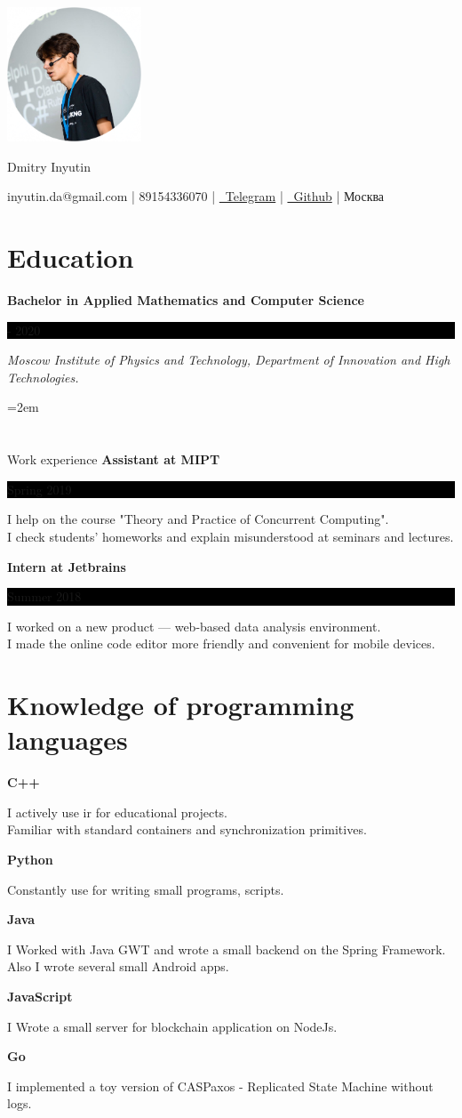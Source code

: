 \documentclass[fontsize=11pt]{article}
\newcommand{\MyName}[1]{ %
    \Huge \centering #1
    \par \normalsize \normalfont}
\newcommand{\NewPart}[1]{\section*{#1}}
\newcommand{\ProgrammingEntry}[2]{
    \noindent \textbf{#1} \hfill      %

    \noindent \small #2 %
    \normalsize \par}
\newcommand{\EducationEntry}[4]{
    \noindent \textbf{#1} \hfill      %
    \colorbox{Black}{
      \parbox{10em}{
      \color{White} \centering #2}} \par   %
    \noindent \textit{#3} \par        %
    \noindent\hangindent=2em\hangafter=0 \small #4 %
    \normalsize \par}
\newcommand{\WorkEntry}[3]{       %
    \noindent \large \textbf{#1} \hfill      %
    \colorbox{Black}{%
      \parbox{10em}{%
      \color{White} \centering #2}} \par  %
    \noindent \small #3 %
    \normalsize \par}
\begin{document}
\begin{minipage}{0.2\textwidth}%
\includegraphics[width=4cm]{me.png}
\end{minipage}%
\hfill%
\begin{minipage}{14cm}\raggedright
\bigskip
\bigskip
\bigskip
\bigskip
\bigskip
\bigskip
\MyName{Dmitry Inyutin}
\bigskip
{inyutin.da@gmail.com | 89154336070 | \href{https://t.me/inyutin}{\faTelegram \, Telegram} | \href{https://github.com/inyutin}{\faGithub \, Github} | Москва}
\end{minipage}



\NewPart{Education}{}
\EducationEntry
{Bachelor in Applied Mathematics and Computer Science}
{2016 - 2020}
{Moscow Institute of Physics and Technology, Department of Innovation and High Technologies.}

\NewPart{Work experience}{}
\WorkEntry
{Assistant at MIPT}
{Spring 2019}
{I help on the course "Theory and Practice of Concurrent Computing". \\ I check students' homeworks and explain misunderstood at seminars and lectures.}

\bigskip

\WorkEntry
{Intern at Jetbrains}
{Summer 2018}
{I worked on a new product — web-based data analysis environment. \\ I made the online code editor more friendly and convenient for mobile devices.}

\NewPart{Knowledge of programming languages}{}
\ProgrammingEntry
{C++ \bigstar \bigstar \bigstar}
{I actively use ir for educational projects. \\ Familiar with standard containers and synchronization primitives.}
\bigskip
\ProgrammingEntry
{Python \bigstar \bigstar \bigstar}
{Constantly use for writing small programs, scripts.}
\bigskip
\ProgrammingEntry
{Java \bigstar \bigstar}
{I Worked with Java GWT and wrote a small backend on the Spring Framework. \\
Also I wrote several small Android apps.}
\bigskip
\ProgrammingEntry
{JavaScript \bigstar \bigstar}
{I Wrote a small server for blockchain application on NodeJs.}
\bigskip
\ProgrammingEntry
{Go \bigstar}
{I implemented a toy version of CASPaxos - Replicated State Machine without logs.}
\end{document}
